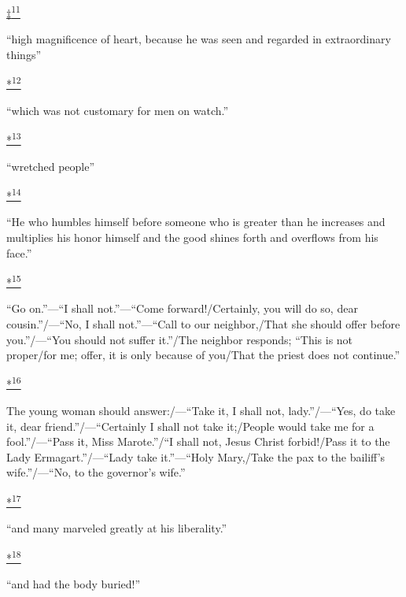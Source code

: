 \protect\hypertarget{23_NOTES.xhtmlux5cux23id_2432}{\protect\hyperlink{09_Chapter_Two__THE_CRAVING_FOR_A_M.xhtmlux5cux23id_2431}{‡\textsuperscript{11}}}
``high magnificence of heart, because he was seen and regarded in
extraordinary things''

\protect\hypertarget{23_NOTES.xhtmlux5cux23id_2434}{\protect\hyperlink{09_Chapter_Two__THE_CRAVING_FOR_A_M.xhtmlux5cux23id_2433}{*\textsuperscript{12}}}
``which was not customary for men on watch.''

\protect\hypertarget{23_NOTES.xhtmlux5cux23id_2308}{\protect\hyperlink{09_Chapter_Two__THE_CRAVING_FOR_A_M.xhtmlux5cux23id_2307}{*\textsuperscript{13}}}
``wretched people''

\protect\hypertarget{23_NOTES.xhtmlux5cux23id_2436}{\protect\hyperlink{09_Chapter_Two__THE_CRAVING_FOR_A_M.xhtmlux5cux23id_2435}{*\textsuperscript{14}}}
``He who humbles himself before someone who is greater than he increases
and multiplies his honor himself and the good shines forth and overflows
from his face.''

\protect\hypertarget{23_NOTES.xhtmlux5cux23id_2438}{\protect\hyperlink{09_Chapter_Two__THE_CRAVING_FOR_A_M.xhtmlux5cux23id_2437}{*\textsuperscript{15}}}
``Go on.''---``I shall not.''---``Come forward!/Certainly, you will do
so, dear cousin.''/---``No, I shall not.''---``Call to our
neighbor,/That she should offer before you.''/---``You should not suffer
it.''/The neighbor responds; ``This is not proper/for me; offer, it is
only because of you/That the priest does not continue.''

\protect\hypertarget{23_NOTES.xhtmlux5cux23id_2440}{\protect\hyperlink{09_Chapter_Two__THE_CRAVING_FOR_A_M.xhtmlux5cux23id_2439}{*\textsuperscript{16}}}
The young woman should answer:/---``Take it, I shall not,
lady.''/---``Yes, do take it, dear friend.''/---``Certainly I shall not
take it;/People would take me for a fool.''/---``Pass it, Miss
Marote.''/``I shall not, Jesus Christ forbid!/Pass it to the Lady
Ermagart.''/---``Lady take it.''---``Holy Mary,/Take the pax to the
bailiff's wife.''/---``No, to the governor's wife.''

\protect\hypertarget{23_NOTES.xhtmlux5cux23id_2442}{\protect\hyperlink{09_Chapter_Two__THE_CRAVING_FOR_A_M.xhtmlux5cux23id_2441}{*\textsuperscript{17}}}
``and many marveled greatly at his liberality.''

\protect\hypertarget{23_NOTES.xhtmlux5cux23id_2444}{\protect\hyperlink{09_Chapter_Two__THE_CRAVING_FOR_A_M.xhtmlux5cux23id_2443}{*\textsuperscript{18}}}
``and had the body buried!''

